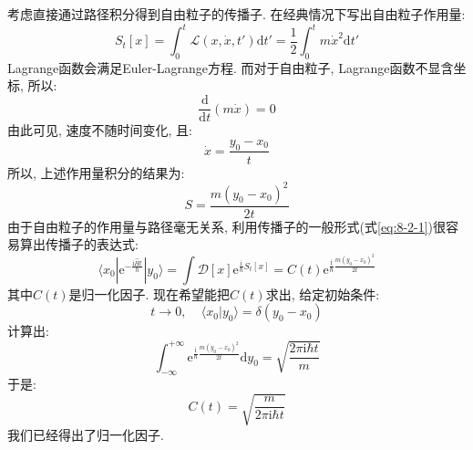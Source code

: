         \splitline

        考虑直接通过路径积分得到自由粒子的传播子. 在经典情况下写出自由粒子作用量:
        \begin{equation}
            S_t[x] = \int_0^t \mathcal{L}(x,\dot{x},t') \mathrm{d}t' = \frac 12 \int_0^t m\dot{x}^2 \mathrm{d}t'
        \end{equation}
        Lagrange函数会满足Euler-Lagrange方程. 而对于自由粒子, Lagrange函数不显含坐标, 所以:
        \begin{equation}
            \frac {\mathrm{d}}{\mathrm{d}t} (m \dot x) = 0
        \end{equation}
        由此可见, 速度不随时间变化, 且:
        \begin{equation}
            \dot{x} = \frac{y_0 - x_0}t
        \end{equation}
        所以, 上述作用量积分的结果为:
        \begin{equation}
            S = \frac{m(y_0 - x_0)^2}{2t}
        \end{equation}
        由于自由粒子的作用量与路径毫无关系, 利用传播子的一般形式(式\ref{eq:8-2-1})很容易算出传播子的表达式:
        \begin{equation}
            \langle x_0 | \mathrm{e}^{-\frac {\mathrm{i}\hat{H}t}{\hbar}} | y_0 \rangle = \int \mathcal{D}[x] \mathrm{e}^{ \frac{\mathrm{i}}{\hbar} S_t[x] } = C(t) \mathrm{e}^{\frac {\mathrm{i}}{\hbar} \frac{m(y_0 - x_0)^2}{2t}}
        \end{equation}
        其中$C(t)$是归一化因子. 现在希望能把$C(t)$求出, 给定初始条件:
        \begin{equation}
            t \to 0,~~~~~\langle x_0|y_0\rangle = \delta(y_0-x_0)
        \end{equation}
        计算出:
        \begin{equation}
            \int_{-\infty}^{+\infty} \mathrm{e}^{\frac {\mathrm{i}}{\hbar} \frac {m(y_0 - x_0)^2}{2t}}\mathrm{d}y_0 = \sqrt{\frac {2\pi\mathrm{i}\hbar t}m}
        \end{equation}
        于是:
        \begin{equation}
            C(t) = \sqrt{\frac m{2\pi\mathrm{i}\hbar t}}
        \end{equation}
        我们已经得出了归一化因子. 

